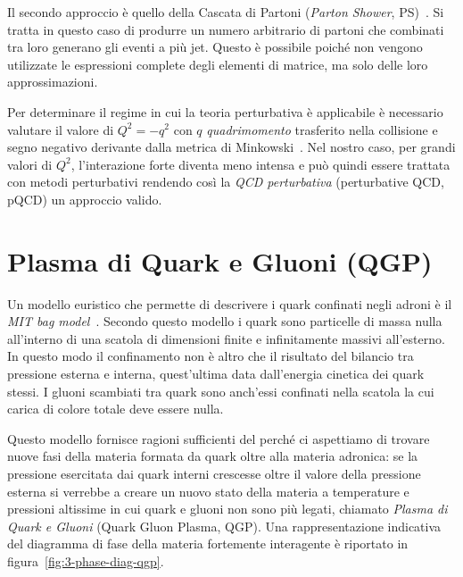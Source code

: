         Il secondo approccio è quello della Cascata di Partoni (\textit{Parton Shower}, PS)~\cite{Bambah_1989}. Si tratta in questo caso di produrre un numero arbitrario di partoni che combinati tra loro generano gli eventi a più jet. Questo è possibile poiché non vengono utilizzate le espressioni complete degli elementi di matrice, ma solo delle loro approssimazioni.

        Per determinare il regime in cui la teoria perturbativa è applicabile è necessario valutare il valore di $Q^2 = - q^2$ con $q$ \textit{quadrimomento} trasferito nella collisione e segno negativo derivante dalla metrica di Minkowski~\cite{Altarelli_2004}. Nel nostro caso, per grandi valori di $Q^2$, l'interazione forte diventa meno intensa e può quindi essere trattata con metodi perturbativi rendendo così la \textit{QCD perturbativa} (perturbative QCD, pQCD) un approccio valido.

\newpage

\section{Plasma di Quark e Gluoni (QGP)}
\label{sec:QGP}
    Un modello euristico che permette di descrivere i quark confinati negli adroni è il \textit{MIT bag model}~\cite{Wong_1994}. Secondo questo modello i quark sono particelle di massa nulla all'interno di una scatola di dimensioni finite e infinitamente massivi all'esterno. In questo modo il confinamento non è altro che il risultato del bilancio tra pressione esterna e interna, quest'ultima data dall'energia cinetica dei quark stessi. I gluoni scambiati tra quark sono anch'essi confinati nella scatola la cui carica di colore totale deve essere nulla.
    
    Questo modello fornisce ragioni sufficienti del perché ci aspettiamo di trovare nuove fasi della materia formata da quark oltre alla materia adronica: se la pressione esercitata dai quark interni crescesse oltre il valore della pressione esterna si verrebbe a creare un nuovo stato della materia a temperature e pressioni altissime in cui quark e gluoni non sono più legati, chiamato \textit{Plasma di Quark e Gluoni} (Quark Gluon Plasma, QGP). Una rappresentazione indicativa del diagramma di fase della materia fortemente interagente è riportato in figura~\ref{fig:3-phase-diag-qgp}.
    
